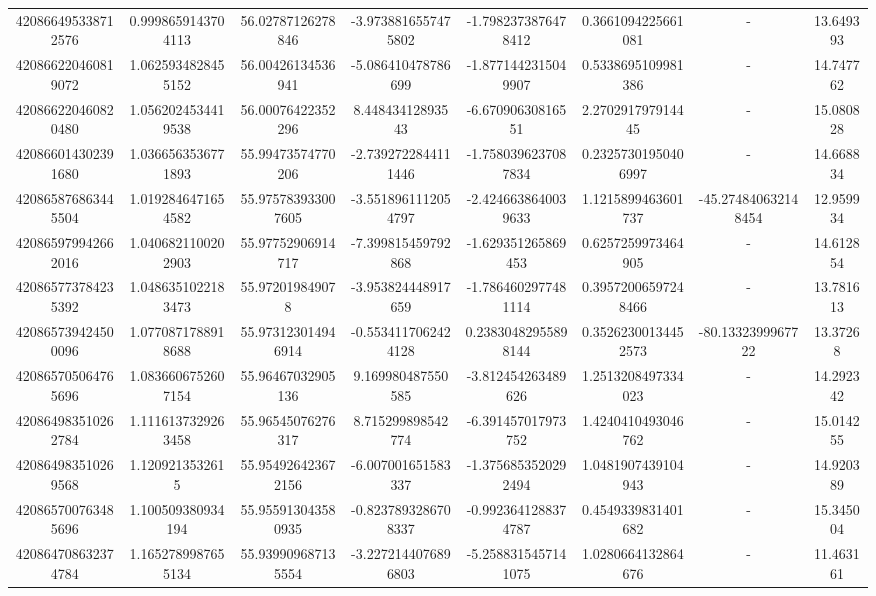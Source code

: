 \documentclass{article}
\begin{document}
\begin{landscape}
\begin{longtable}[c]{S[table-format=18.0]S[table-format=2.15]S[table-format=2.15]S[table-format=-2.17]S[table-format=-2.16]S[table-format=-2.16]S[table-format=-3.16]S[table-format=2.7]}
420866495338712576 & 0.9998659143704113 & 56.02787126278846  & -3.9738816557475802  & -1.7982373876478412    & 0.3661094225661081  & {-}                  & 13.649393  \\
420866220460819072 & 1.0625934828455152 & 56.00426134536941  & -5.086410478786699   & -1.8771442315049907    & 0.5338695109981386  & {-}                  & 14.747762  \\
420866220460820480 & 1.0562024534419538 & 56.00076422352296  & 8.44843412893543     & -6.67090630816551      & 2.270291797914445   & {-}                  & 15.080828  \\
420866014302391680 & 1.0366563536771893 & 55.99473574770206  & -2.7392722844111446  & -1.7580396237087834    & 0.23257301950406997 & {-}                  & 14.668834  \\
420865876863445504 & 1.0192846471654582 & 55.975783933007605 & -3.5518961112054797  & -2.4246638640039633    & 1.1215899463601737  & -45.274840632148454 & 12.959934  \\
420865979942662016 & 1.0406821100202903 & 55.97752906914717  & -7.399815459792868   & -1.629351265869453     & 0.6257259973464905  & {-}                  & 14.612854  \\
420865773784235392 & 1.0486351022183473 & 55.972019849078    & -3.953824448917659   & -1.7864602977481114    & 0.39572006597248466 & {-}                  & 13.781613  \\
420865739424500096 & 1.0770871788918688 & 55.973123014946914 & -0.5534117062424128  & 0.23830482955898144    & 0.35262300134452573 & -80.1332399967722   & 13.37268   \\
420865705064765696 & 1.0836606752607154 & 55.96467032905136  & 9.169980487550585    & -3.812454263489626     & 1.2513208497334023  & {-}                  & 14.292342  \\
420864983510262784 & 1.1116137329263458 & 55.96545076276317  & 8.715299898542774    & -6.391457017973752     & 1.4240410493046762  & {-}                  & 15.014255  \\
420864983510269568 & 1.1209213532615    & 55.954926423672156 & -6.007001651583337   & -1.3756853520292494    & 1.0481907439104943  & {-}                  & 14.920389  \\
420865700763485696 & 1.100509380934194  & 55.955913043580935 & -0.8237893286708337  & -0.9923641288374787    & 0.4549339831401682  & {-}                  & 15.345004  \\
420864708632374784 & 1.1652789987655134 & 55.939909687135554 & -3.2272144076896803  & -5.2588315457141075    & 1.0280664132864676  & {-}                  & 11.463161  \\

\end{longtable}
\end{landscape}
\end{document}
